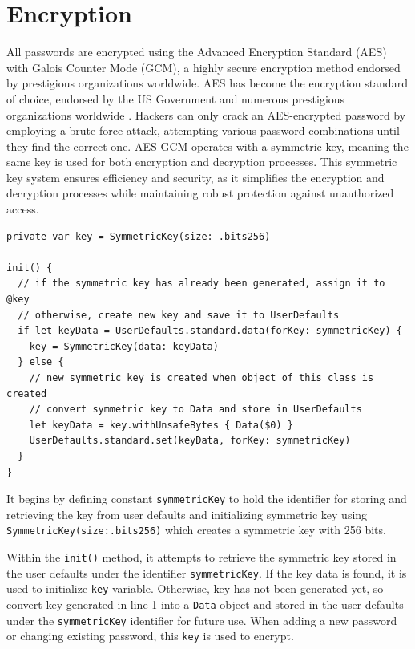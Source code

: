 \documentclass[10pt, titlepage]{article}
\begin{document}
\section*{Encryption}
All passwords are encrypted using the Advanced Encryption Standard (AES) with Galois Counter Mode (GCM), a highly secure encryption method endorsed by prestigious organizations worldwide. AES has become the encryption standard of choice, endorsed by the US Government and numerous prestigious organizations worldwide \cite{team_password}. Hackers can only crack an AES-encrypted password by employing a brute-force attack, attempting various password combinations until they find the correct one. AES-GCM operates with a symmetric key, meaning the same key is used for both encryption and decryption processes. This symmetric key system ensures efficiency and security, as it simplifies the encryption and decryption processes while maintaining robust protection against unauthorized access. 
\begin{center}
\begin{minipage}{\linewidth}
\begin{lstlisting}
private var key = SymmetricKey(size: .bits256)

init() {
  // if the symmetric key has already been generated, assign it to @key
  // otherwise, create new key and save it to UserDefaults
  if let keyData = UserDefaults.standard.data(forKey: symmetricKey) {
    key = SymmetricKey(data: keyData)
  } else {
    // new symmetric key is created when object of this class is created
    // convert symmetric key to Data and store in UserDefaults
    let keyData = key.withUnsafeBytes { Data($0) }
    UserDefaults.standard.set(keyData, forKey: symmetricKey)
  }
}
\end{lstlisting}
\end{minipage}
\end{center}
It begins by defining constant \texttt{symmetricKey} to hold the identifier for storing and retrieving the key from user defaults and initializing symmetric key using \texttt{SymmetricKey(size:.bits256)} which creates a symmetric key with 256 bits. 

Within the \texttt{init()} method, it attempts to retrieve the symmetric key stored in the user defaults under the identifier \texttt{symmetricKey}. If the key data is found, it is used to initialize \texttt{key} variable. Otherwise, key has not been generated yet, so convert key generated in line 1 into a \texttt{Data} object and stored in the user defaults under the \texttt{symmetricKey} identifier for future use. When adding a new password or changing existing password, this \texttt{key} is used to encrypt.
\end{document}
